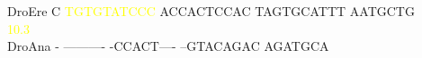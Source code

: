 \documentclass[11pt,twoside,reqno,a4paper]{article}
\begin{document}
{DroEre	C	\textcolor{Yellow}{T}\textcolor{Yellow}{G}\textcolor{Yellow}{T}\textcolor{Yellow}{G}\textcolor{Yellow}{T}\textcolor{Yellow}{A}\textcolor{Yellow}{T}\textcolor{Yellow}{C}\textcolor{Yellow}{C}\textcolor{Yellow}{C}	ACCACTCCAC	TAGTGCATTT	AATGCTG\\
\hspace*{7\charwidth}\hspace*{1\charwidth}\hspace*{1\charwidth}\textcolor{Yellow}{10.3}\hspace*{1\charwidth}\hspace*{1\charwidth}\hspace*{1\charwidth}\\
DroAna	-	----------	-CCACT----	--GTACAGAC	AGATGCA\\
\hspace*{7\charwidth}\hspace*{1\charwidth}\hspace*{1\charwidth}\hspace*{1\charwidth}\hspace*{1\charwidth}\\
\\
}
\end{document}
